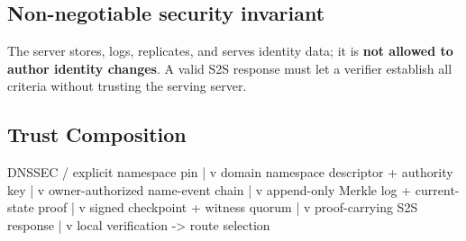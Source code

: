 \documentclass[
]{article}
\newenvironment{Shaded}{}{}
\newcommand{\NormalTok}[1]{#1}
\begin{document}
\hypertarget{non-negotiable-security-invariant}{%
\subsection{Non-negotiable security
invariant}\label{non-negotiable-security-invariant}}

The server stores, logs, replicates, and serves identity data; it is
\textbf{not allowed to author identity changes}. A valid S2S response
must let a verifier establish all criteria without trusting the serving
server.

\hypertarget{trust-composition}{%
\subsection{Trust Composition}\label{trust-composition}}

\begin{Shaded}
\begin{Highlighting}[]
\NormalTok{DNSSEC / explicit namespace pin}
\NormalTok{        |}
\NormalTok{        v}
\NormalTok{domain namespace descriptor + authority key}
\NormalTok{        |}
\NormalTok{        v}
\NormalTok{owner{-}authorized name{-}event chain}
\NormalTok{        |}
\NormalTok{        v}
\NormalTok{append{-}only Merkle log + current{-}state proof}
\NormalTok{        |}
\NormalTok{        v}
\NormalTok{signed checkpoint + witness quorum}
\NormalTok{        |}
\NormalTok{        v}
\NormalTok{proof{-}carrying S2S response}
\NormalTok{        |}
\NormalTok{        v}
\NormalTok{local verification {-}\textgreater{} route selection}
\end{Highlighting}
\end{Shaded}
\end{document}
